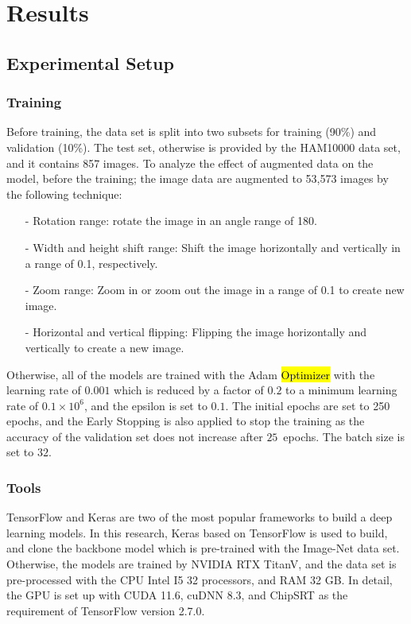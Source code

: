 \documentclass[sensors,article,accept,pdftex,moreauthors]{Definitions/mdpi}
\begin{document}
	\section{Results}
	\subsection{Experimental Setup}
	\subsubsection{Training}
	Before training, the data set is split into two subsets for training (90\%) and validation (10\%). The test set, otherwise is  provided by the HAM10000 data set, and it contains 857 images. To analyze the effect of augmented data on the model, before the training; the image data are augmented to 53,573 images by the following technique:
	
	\begin{itemize}
	\item[-] Rotation range: rotate the image in an {angle range of 180}. 
	\item[-] Width and height shift range: Shift the image horizontally and vertically {in a range of 0.1}, respectively. 
	\item[-] Zoom range:  Zoom in or zoom out the image {in a range of 0.1} to create new image. 
	\item[-] Horizontal and vertical flipping: Flipping the image horizontally and vertically to create a new image.
	\end{itemize}
	
	Otherwise, all of the models are trained with the Adam \hl{Optimizer} %
 \cite{6980} with the learning rate of $0.001$ which is reduced by a factor of $0.2$ to a minimum learning rate of $0.1 \times 10^6$, and the epsilon is set to $0.1$. The initial epochs are set to 250 epochs, and the Early Stopping is also applied to stop the training as the accuracy of the validation set does not increase after $25$~epochs. The batch size is set to $32$.
	
	\subsubsection{Tools}
	TensorFlow and Keras are two of the most popular frameworks to build a deep learning models. In this research, Keras based on TensorFlow is used to build, and clone the backbone model which is pre-trained with the Image-Net data set. Otherwise, the models are trained by NVIDIA RTX TitanV, and the data set is pre-processed with the CPU Intel I5 32 processors, and RAM 32 GB. In detail, the GPU is set up with CUDA 11.6, cuDNN 8.3, and ChipSRT as the requirement of TensorFlow version 2.7.0.
\end{document}

